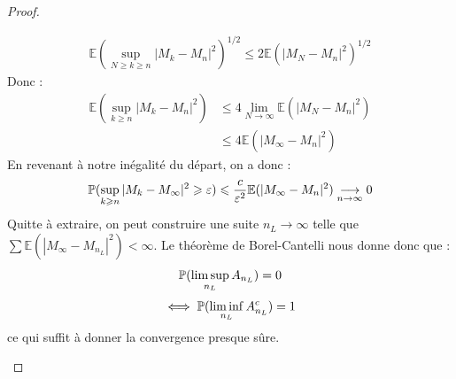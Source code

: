 \begin{proof}
\begin{enumerate}
\begin{align*}
                \mathbb{E}(\sup_{N \geqslant k \geqslant n} | M_k - M_n|^2)^{1/2} \leqslant 2 \mathbb{E}(|M_N - M_n|^2)^{1/2} 
            \end{align*}
        Donc : 
            \begin{align*}
                \mathbb{E}(\sup_{k \geqslant n} |M_k - M_n|^2) &\leqslant 4 \lim_{N \to \infty} \mathbb{E}(|M_N - M_n|^2) \\ 
                & \leqslant 4 \mathbb{E}( |M_\infty - M_n|^2) 
            \end{align*}
        En revenant à notre inégalité du départ, on a donc : 
            $$ \mathbb{P}(\sup_{k \geqslant n} |M_k - M_\infty|^2 \geqslant \varepsilon) \leqslant \frac{c}{ \varepsilon^2} \mathbb{E}(|M_\infty - M_n|^2) \underset{n \to \infty}{\longrightarrow} 0 $$
        Quitte à extraire, on peut construire une suite $ n_L \to \infty$ telle que $\sum \mathbb{E}(|M_\infty - M_{n_L}|^2) < \infty$.
        Le théorème de Borel-Cantelli nous donne donc que : 
            $$ \mathbb{P}(\limsup_{n_L} A_{n_L}) = 0 $$
            $$ \iff \mathbb{P}(\liminf_{n_L} A_{n_L}^c) = 1 $$
        ce qui suffit à donner la convergence presque sûre.
    \end{enumerate}
\end{proof}
